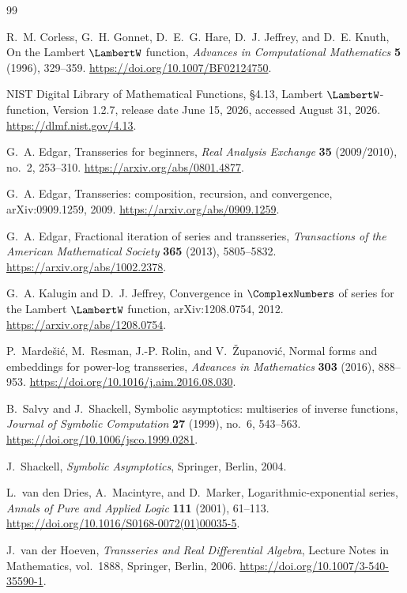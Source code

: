 \documentclass[11pt,oneside]{book}
\theoremstyle{definition}
\theoremstyle{remark}
\begin{document}
\begin{thebibliography}{99}

R.~M. Corless, G.~H. Gonnet, D.~E.~G. Hare, D.~J. Jeffrey, and
D.~E. Knuth,
\newblock On the Lambert \(\LambertW\) function,
\newblock \emph{Advances in Computational Mathematics} \textbf{5} (1996),
329--359.
\newblock \url{https://doi.org/10.1007/BF02124750}.

NIST Digital Library of Mathematical Functions,
\newblock \S4.13, Lambert \(\LambertW\)-function,
\newblock Version 1.2.7, release date June 15, 2026,
accessed August 31, 2026.
\newblock \url{https://dlmf.nist.gov/4.13}.

G.~A. Edgar,
\newblock Transseries for beginners,
\newblock \emph{Real Analysis Exchange} \textbf{35} (2009/2010), no.~2,
253--310.
\newblock \url{https://arxiv.org/abs/0801.4877}.

G.~A. Edgar,
\newblock Transseries: composition, recursion, and convergence,
\newblock arXiv:0909.1259, 2009.
\newblock \url{https://arxiv.org/abs/0909.1259}.

G.~A. Edgar,
\newblock Fractional iteration of series and transseries,
\newblock \emph{Transactions of the American Mathematical Society}
\textbf{365} (2013), 5805--5832.
\newblock \url{https://arxiv.org/abs/1002.2378}.


G.~A. Kalugin and D.~J. Jeffrey,
\newblock Convergence in $\ComplexNumbers$ of series for the Lambert $\LambertW$ function,
\newblock arXiv:1208.0754, 2012.
\newblock \url{https://arxiv.org/abs/1208.0754}.

P.~Marde\v{s}i\'c, M.~Resman, J.-P. Rolin, and V.~\v{Z}upanovi\'c,
\newblock Normal forms and embeddings for power-log transseries,
\newblock \emph{Advances in Mathematics} \textbf{303} (2016), 888--953.
\newblock \url{https://doi.org/10.1016/j.aim.2016.08.030}.

B.~Salvy and J.~Shackell,
\newblock Symbolic asymptotics: multiseries of inverse functions,
\newblock \emph{Journal of Symbolic Computation} \textbf{27} (1999),
no.~6, 543--563.
\newblock \url{https://doi.org/10.1006/jsco.1999.0281}.

J.~Shackell,
\newblock \emph{Symbolic Asymptotics},
\newblock Springer, Berlin, 2004.

L.~van den Dries, A.~Macintyre, and D.~Marker,
\newblock Logarithmic-exponential series,
\newblock \emph{Annals of Pure and Applied Logic} \textbf{111} (2001),
61--113.
\newblock \url{https://doi.org/10.1016/S0168-0072(01)00035-5}.

J.~van der Hoeven,
\newblock \emph{Transseries and Real Differential Algebra},
\newblock Lecture Notes in Mathematics, vol.~1888,
Springer, Berlin, 2006.
\newblock \url{https://doi.org/10.1007/3-540-35590-1}.

\end{thebibliography}
\end{document}

